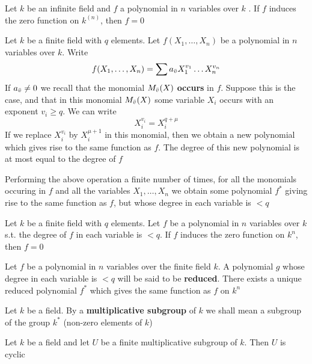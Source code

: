 \documentclass[11pt]{article}
\begin{document}
\begin{corollary}[]
Let \(k\) be an infinite field and \(f\) a polynomial in \(n\) variables over \(k\) . If \(f\)
induces the zero function on \(k^{(n)}\), then \(f=0\)
\end{corollary}

Let \(k\) be a finite field with \(q\) elements. Let \(f(X_1,\dots,X_n)\) be a polynomial in \(n\)
variables over \(k\). Write
\begin{equation*}
f(X_1,\dots,X_n)=\sum a_{\bar{v}}X_1^{v_1}\dots X_n^{v_n}
\end{equation*}
If \(a_{\bar{v}}\neq 0\)  we recall that the monomial \(M_{\bar{v}}(X)\) \textbf{occurs} in \(f\). Suppose this
is the case, and that in this monomial \(M_{\bar{v}}(X)\) some variable \(X_i\) occurs with an
exponent \(v_i\ge q\). We can write
\begin{equation*}
X_i^{v_i}=X_i^{q+\mu}
\end{equation*}
If we replace \(X_i^{v_i}\) by \(X_i^{\mu+1}\) in this monomial, then we obtain a new polynomial which
gives rise to the same function as \(f\). The degree of this new polynomial is at most equal to
the degree of \(f\)

Performing the above operation a finite number of times, for all the monomials occuring in \(f\)
and all the variables \(X_1,\dots,X_n\) we obtain some polynomial \(f^*\) giving rise to the same
function as \(f\), but whose degree in each variable is \(<q\)

\begin{corollary}[]
Let \(k\) be a finite field with \(q\) elements. Let \(f\) be a polynomial in \(n\) variables
over \(k\) s.t. the degree of \(f\) in each variable is \(<q\). If \(f\) induces the zero
function on \(k^n\), then \(f=0\)
\end{corollary}

Let \(f\) be a polynomial in \(n\) variables over the finite field \(k\). A polynomial \(g\)
whose degree in each variable is \(<q\) will be said to be \textbf{reduced}. There exists a unique reduced
polynomial \(f^*\) which gives the same function as \(f\) on \(k^n\)

Let \(k\) be a field. By a \textbf{multiplicative subgroup} of \(k\) we shall mean a subgroup of the
group \(k^*\) (non-zero elements of \(k\))

\begin{theorem}[]
\label{thm1.4.1.9}
Let \(k\) be a field and let \(U\) be a finite multiplicative subgroup of \(k\). Then \(U\) is cyclic
\end{theorem}
\end{document}
